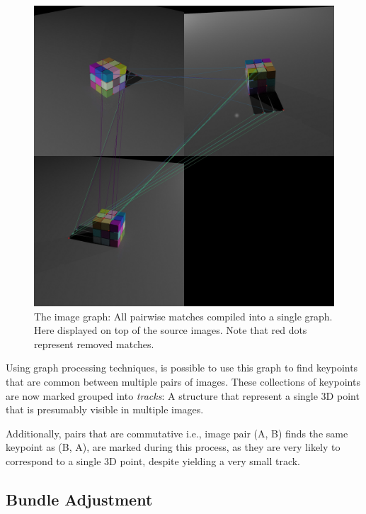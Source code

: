\documentclass[preprint,acmtog]{acmart}
\begin{document}
\begin{figure}[ht]
  \centering
  \includegraphics[width=1.0\linewidth]{filtered_image_graph}
  \caption{The image graph: All pairwise matches compiled into a single
    graph. Here displayed on top of the source images. Note that red dots
    represent removed matches.}
\end{figure}

Using graph processing techniques, is possible to use this graph to find
keypoints that are common between multiple pairs of images. These collections of
keypoints are now marked grouped into \emph{tracks}: A structure that represent
a single 3D point that is presumably visible in multiple images.

Additionally, pairs that are commutative i.e., image pair (A, B) finds the same
keypoint as (B, A), are marked during this process, as they are very likely to
correspond to a single 3D point, despite yielding a very small track.


\subsection{Bundle Adjustment}
\end{document}
